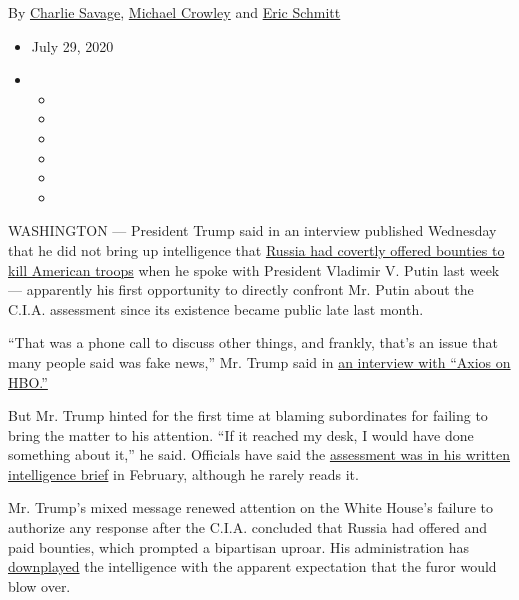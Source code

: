 By \href{https://www.nytimes.com/by/charlie-savage}{Charlie Savage},
\href{https://www.nytimes.com/by/michael-crowley}{Michael Crowley} and
\href{https://www.nytimes.com/by/eric-schmitt}{Eric Schmitt}

\begin{itemize}
\item
  July 29, 2020
\item
  \begin{itemize}
  \item
  \item
  \item
  \item
  \item
  \item
  \end{itemize}
\end{itemize}

WASHINGTON --- President Trump said in an interview published Wednesday
that he did not bring up intelligence that
\href{https://www.nytimes.com/2020/06/26/us/politics/russia-afghanistan-bounties.html}{Russia
had covertly offered bounties to kill American troops} when he spoke
with President Vladimir V. Putin last week --- apparently his first
opportunity to directly confront Mr. Putin about the C.I.A. assessment
since its existence became public late last month.

``That was a phone call to discuss other things, and frankly, that's an
issue that many people said was fake news,'' Mr. Trump said in
\href{https://www.axios.com/trump-russia-bounties-taliban-putin-call-4a0f6110-ab58-41c0-96fc-57b507462af1.html}{an
interview with ``Axios on HBO.''}

But Mr. Trump hinted for the first time at blaming subordinates for
failing to bring the matter to his attention. ``If it reached my desk, I
would have done something about it,'' he said. Officials have said the
\href{https://www.nytimes.com/2020/06/29/us/politics/russian-bounty-trump.html}{assessment
was in his written intelligence brief} in February, although he rarely
reads it.

Mr. Trump's mixed message renewed attention on the White House's failure
to authorize any response after the C.I.A. concluded that Russia had
offered and paid bounties, which prompted a bipartisan uproar. His
administration has
\href{https://www.nytimes.com/2020/07/03/us/politics/memo-russian-bounties.html}{downplayed}
the intelligence with the apparent expectation that the furor would blow
over.

